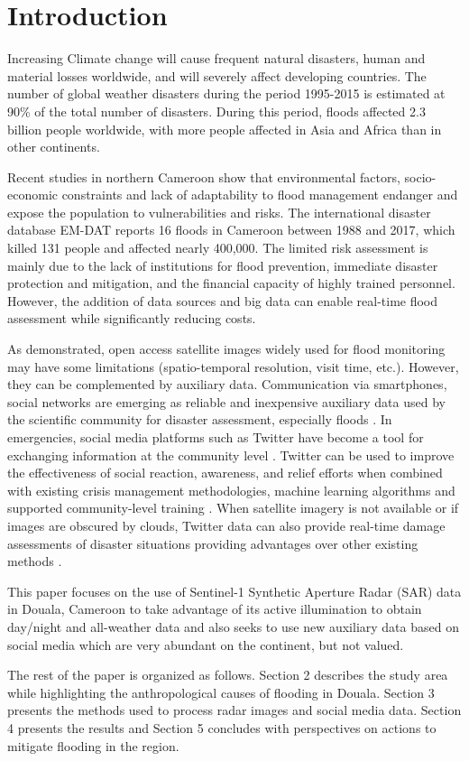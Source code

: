 \section{Introduction}
Increasing Climate change will cause frequent natural disasters, human and material losses worldwide, and will severely affect developing countries. The number of global weather disasters during the period 1995-2015 is estimated at 90\% of the total number of disasters\cite{cred2015human}. During this period, floods affected 2.3 billion people worldwide, with more people affected in Asia and Africa than in other continents\cite{wahlstrom_human_2015}. 

Recent studies in northern Cameroon show that environmental factors, socio-economic constraints and lack of adaptability to flood management endanger and expose the population to vulnerabilities and risks\cite{bang_irony_2017,bang_evaluating_2019}. The international disaster database EM-DAT reports 16 floods in Cameroon between 1988 and 2017, which killed 131 people and affected nearly 400,000\cite{shen2019spatial}. The limited risk assessment is mainly due to the lack of institutions for flood prevention, immediate disaster protection and mitigation, and the financial capacity of highly trained personnel. However, the addition of data sources and big data can enable real-time flood assessment while significantly reducing costs\cite{ towe2020rethinking}. 

As demonstrated\cite{notti_potential_2018,panchal_flooding_2019}, open access satellite images widely used for flood monitoring may have some limitations (spatio-temporal resolution, visit time, etc.).  However, they can be complemented by auxiliary data. Communication via smartphones, social networks are emerging as reliable and inexpensive auxiliary data used by the scientific community for disaster assessment, especially floods \cite{le2016crowdsourced}. In emergencies, social media platforms such as Twitter have become a tool for exchanging information at the community level \cite{lacassin2020rapid}. Twitter can be used to improve the effectiveness of social reaction, awareness, and relief efforts when combined with existing crisis management methodologies, machine learning algorithms \cite{singh2019event} and supported community-level training \cite{carley2016crowd}. When satellite imagery is not available or if images are obscured by clouds, Twitter data can also provide real-time damage assessments of disaster situations providing advantages over other existing methods \cite{david2016tweeting, baranowski2020social}. 

This paper focuses on the use of Sentinel-1 Synthetic Aperture Radar (SAR) data in Douala, Cameroon to take advantage of its active illumination to obtain day/night and all-weather data and also seeks to use new auxiliary data based on social media which are very abundant on the continent, but not valued. 

The rest of the paper is organized as follows. Section 2 describes the study area while highlighting the anthropological causes of flooding in Douala. Section 3 presents the methods used to process radar images and social media data. Section 4 presents the results and Section 5 concludes with perspectives on actions to mitigate flooding in the region.